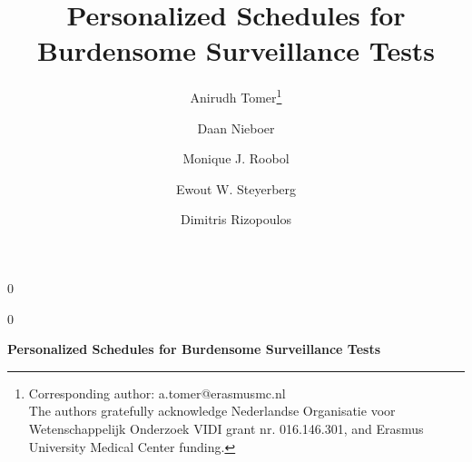 \documentclass[12pt]{article}
\newcommand{\blind}{0}
\begin{document}
%

\def\spacingset#1{\renewcommand{\baselinestretch}%
{#1}\small\normalsize} \spacingset{1}



\blind
{
  \title{\bf Personalized Schedules for Burdensome Surveillance Tests}

\author[1]{Anirudh Tomer\footnote{Corresponding author: a.tomer@erasmusmc.nl\\The authors gratefully acknowledge Nederlandse Organisatie voor Wetenschappelijk Onderzoek VIDI grant nr. 016.146.301, and Erasmus University Medical Center funding.}}
\author[2]{Daan Nieboer}
\author[3]{Monique J. Roobol}
\author[2,4]{Ewout W. Steyerberg}
\author[1]{Dimitris Rizopoulos}




  \maketitle
} \fi

\blind
{
  \bigskip
  \bigskip
  \bigskip
  \begin{center}
    {\LARGE\bf Personalized Schedules for Burdensome Surveillance Tests}
\end{center}
  \medskip
} \fi
\end{document}
